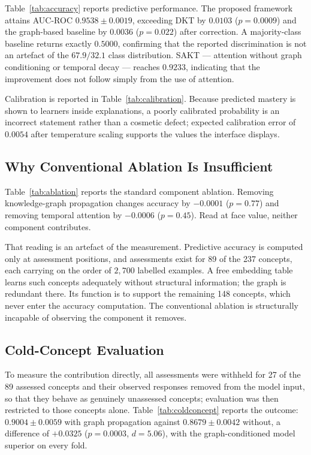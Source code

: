 \documentclass[conference]{IEEEtran}
\begin{document}
Table~\ref{tab:accuracy} reports predictive performance. The proposed framework attains
AUC-ROC $0.9538 \pm 0.0019$, exceeding DKT by $0.0103$ ($p = 0.0009$) and the
graph-based baseline by $0.0036$ ($p = 0.022$) after correction. A majority-class
baseline returns exactly $0.5000$, confirming that the reported discrimination is not an
artefact of the $67.9/32.1$ class distribution. SAKT --- attention without graph
conditioning or temporal decay --- reaches $0.9233$, indicating that the improvement does
not follow simply from the use of attention.

Calibration is reported in Table~\ref{tab:calibration}. Because predicted mastery is
shown to learners inside explanations, a poorly calibrated probability is an incorrect
statement rather than a cosmetic defect; expected calibration error of $0.0054$ after
temperature scaling supports the values the interface displays.

\subsection{Why Conventional Ablation Is Insufficient}

Table~\ref{tab:ablation} reports the standard component ablation. Removing
knowledge-graph propagation changes accuracy by $-0.0001$ ($p = 0.77$) and removing
temporal attention by $-0.0006$ ($p = 0.45$). Read at face value, neither component
contributes.

That reading is an artefact of the measurement. Predictive accuracy is computed only at
assessment positions, and assessments exist for 89 of the 237 concepts, each carrying on
the order of $2{,}700$ labelled examples. A free embedding table learns such concepts
adequately without structural information; the graph is redundant there. Its function is
to support the remaining 148 concepts, which never enter the accuracy computation. The
conventional ablation is structurally incapable of observing the component it removes.

\subsection{Cold-Concept Evaluation}

To measure the contribution directly, all assessments were withheld for 27 of the 89
assessed concepts and their observed responses removed from the model input, so that
they behave as genuinely unassessed concepts; evaluation was then restricted to those
concepts alone. Table~\ref{tab:coldconcept} reports the outcome: $0.9004 \pm 0.0059$
with graph propagation against $0.8679 \pm 0.0042$ without, a difference of $+0.0325$
($p = 0.0003$, $d = 5.06$), with the graph-conditioned model superior on every fold.
\end{document}
